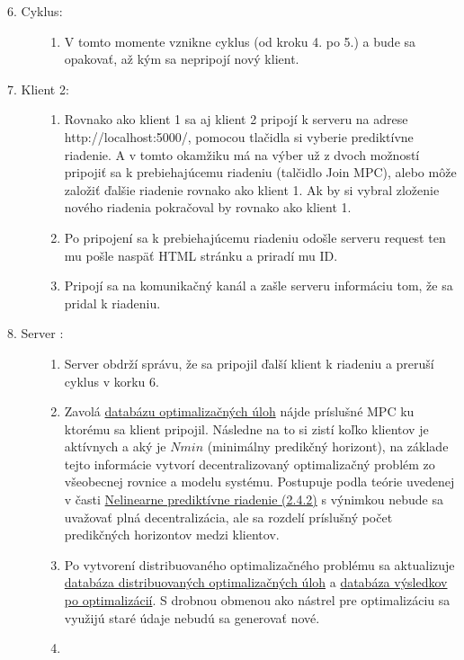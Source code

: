 \begin{description}
{\begin{enumerate}
	\end{enumerate}
}
\item[6. Cyklus:]{\hfill
	\begin{enumerate}
		\item{V tomto momente vznikne cyklus (od kroku 4. po 5.) a bude sa opakovať, až kým sa nepripojí nový klient.}
	\end{enumerate}
}
\item[7. Klient 2:]{\hfill
	\begin{enumerate}
		\item{Rovnako ako klient 1 sa aj klient 2 pripojí k serveru na adrese http://localhost:5000/,  pomocou tlačidla si vyberie prediktívne riadenie. A v tomto okamžiku má na výber už z dvoch možností pripojiť sa k prebiehajúcemu riadeniu (talčidlo Join MPC), alebo môže založiť ďalšie riadenie rovnako ako klient 1. Ak by si vybral zloženie nového riadenia pokračoval by rovnako ako klient 1.}
		\item{
			Po pripojení sa k prebiehajúcemu riadeniu odošle serveru request ten mu pošle naspäť HTML stránku a priradí mu ID.
		}
		\item{ 
			Pripojí sa na komunikačný kanál a zašle serveru informáciu tom, že sa pridal k riadeniu. 
		}
	\end{enumerate}
}
\item[8. Server :]{\hfill
	\begin{enumerate}
		\item{
			Server obdrží správu, že sa pripojil ďalší klient k riadeniu a preruší cyklus v korku 6.
		}
		\item{
			Zavolá \hyperref[DB:OPT]{databázu optimalizačných úloh} nájde príslušné MPC ku ktorému sa klient pripojil. Následne na to si zistí koľko klientov je aktívnych a aký je $Nmin$ (minimálny predikčný horizont), na základe tejto informácie vytvorí decentralizovaný optimalizačný problém zo všeobecnej rovnice a modelu systému. Postupuje podla teórie uvedenej v časti \hyperref[subse:Nelin_MPC_ADMM]{Nelinearne prediktívne riadenie (2.4.2)} s výnimkou nebude sa uvažovať plná decentralizácia, ale sa rozdelí príslušný počet predikčných horizontov medzi klientov.
		}
		\item{
			Po vytvorení distribuovaného optimalizačného problému sa aktualizuje \hyperref[DB:WORKER]{databáza distribuovaných optimalizačných úloh} a \hyperref[DB:WORKER_DATA]{databáza výsledkov po optimalizácií}. S drobnou obmenou ako nástrel pre optimalizáciu sa využijú staré údaje nebudú sa generovať nové. 
		}
		\item{
}
\end{enumerate}}
\end{description}
